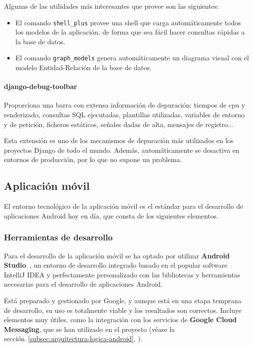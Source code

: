 Algunas de las utilidades más interesantes que provee son las siguientes:

\begin{itemize}
\item El comando \texttt{shell\_plus} provee una shell que carga automáticamente
  todos los modelos de la aplicación, de forma que sea fácil hacer consultas
  rápidas a la base de datos.
\item El comando \texttt{graph\_models} genera automáticamente un diagrama
  visual con el modelo Entidad-Relación de la base de datos.
\end{itemize}

\paragraph{django-debug-toolbar}

Proporciona una barra con extensa información de depuración: tiempos de cpu y
renderizado, consultas SQL ejecutadas, plantillas utilizadas, variables de
entorno y de petición, ficheros estáticos, señales dadas de alta, mensajes de
registro...

Esta extensión es uno de los mecanismos de depuración más utilizados en los
proyectos Django de todo el mundo. Además, automáticamente se desactiva en
entornos de producción, por lo que no supone un problema.

\subsection{Aplicación móvil}

El entorno tecnológico de la aplicación móvil es el estándar para el desarrollo
de aplicaciones Android hoy en día, que consta de los siguientes elementos.

\subsubsection{Herramientas de desarrollo}

Para el desarrollo de la aplicación móvil se ha optado por utilizar
\textbf{Android Studio}~\cite{android-studio}, un entorno de desarrollo
integrado basado en el popular software IntelliJ IDEA y perfectamente
personalizado con las bibliotecas y herramientas necesarias para el desarrollo
de aplicaciones Android.

Está preparado y gestionado por Google, y aunque está en una etapa temprana de
desarrollo, su uso es totalmente viable y los resultados son correctos. Incluye
elementos muy útiles, como la integración con los servicios de \textbf{Google
  Cloud Messaging}, que se han utilizado en el proyecto (véase la
sección~\ref{subsec:arquitectura-logica-android},
\textit{}).


